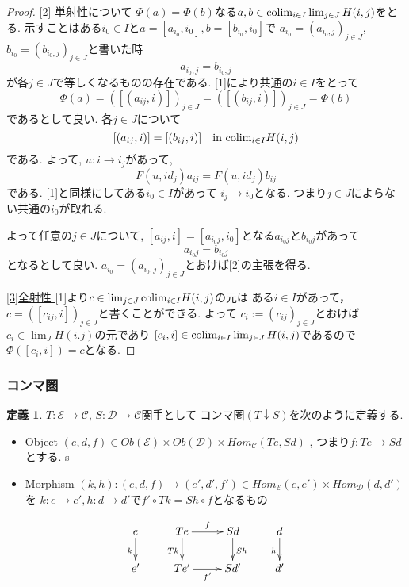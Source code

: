 \documentclass[dvipdfmx,a4paper,11pt]{article}
\newcommand{\colim}{{\rm colim}}
\theoremstyle{definition}
\newtheorem{dfn}[thm]{定義}
\begin{document}
\begin{proof}
\underline{[2] 単射性について }
$\Phi(a)=\Phi(b)$なる$a, b \in \colim_{i \in I} \lim_{j \in J}H(i,j)$をとる. 
示すことはある$i_0 \in I$と$a =[a_{i_0}, i_0], b =[b_{i_0}, i_0]$で
$a_{i_0} = (a_{i_{0},j})_{j \in J}$, $b_{i_0} = (b_{i_{0},j})_{j \in J}$と書いた時
$$
a_{i_{0},j} = b_{i_{0},j}
$$
が各$j \in J$で等しくなるものの存在である. 
[1]により共通の$i \in I$をとって
$$
\Phi(a) = ([(a_{ij}, i)])_{j \in J} = ([(b_{ij}, i)])_{j \in J} = \Phi(b)$$
であるとして良い. 
各$j \in J$について
$$
[(a_{ij}, i)] = [(b_{ij}, i)] \quad \text{in $\colim_{i \in I} H(i,j)$}
$$
である. 
よって, $u : i \to i_{j}$があって, 
$$
F(u, id_{j})a_{ij} = F(u, id_{j})b_{ij}
$$
である. [1]と同様にしてある$i_{0} \in I$があって
$i_{j} \to i_{0}$となる.
つまり$j \in J$によらない共通の$i_{0}$が取れる.

よって任意の$j \in J$について, $[a_{ij}, i] = [a_{i_{0}j}, i_{0}]$となる$a_{i_{0}j}$と$b_{i_{0}j}$があって
$$
a_{i_{0}j} = b_{i_{0}j}
$$
となるとして良い. 
$a_{i_0} = (a_{i_{0},j})_{j \in J}$とおけば[2]の主張を得る. 

\underline{[3]全射性 } 
[1]より$c \in \lim_{j \in J}\colim_{i \in I} H(i,j)$の元は
ある$i \in I$があって， $c= ([c_{ij}, i])_{j \in J}$と書くことができる. 
よって
$c_{i}:=(c_{ij})_{j \in J}$とおけば$c_i \in \lim_{J}H(i.j)$の元であり
$[c_{i} , i] \in \colim_{i \in I} \lim_{j \in J}H(i,j)$であるので
$\Phi([c_i , i])=c$となる. 
\end{proof}

\subsubsection{コンマ圏}
 \begin{tcolorbox}
 [colback = white, colframe = green!35!black, fonttitle = \bfseries,breakable = true]
\begin{dfn}
$T :  \mathcal{E} \to \mathcal{C}$, $S : \mathcal{D} \to \mathcal{C}$関手として
コンマ圏$(T \downarrow S)$を次のように定義する. 
\begin{itemize}
\item Object $(e,d,f) \in Ob(\mathcal{E}) \times Ob(\mathcal{D}) \times Hom_{\mathcal{C}}(Te, Sd)$ , つまり$f : Te \to Sd$とする. s
\item Morphism $(k,h) : (e,d,f)  \to (e',d',f') \in Hom_{\mathcal{E}}(e,e') \times Hom_{\mathcal{D}}(d,d') $ を $k : e \to e', h: d \to d'$で$f' \circ Tk = Sh \circ f$となるもの
\end{itemize}

\begin{equation*}
\xymatrix@C=25pt@R=20pt{
e \ar@{->}[d] _{k}&Te\ar@{->}[d]_{Tk}  \ar@{->}[r]^{f} & Sd\ar@{->}[d]^{Sh} &d\ar@{->}[d]_{h}\\
e'&Te'\ar@{->}[r]_{f'} &Sd'&d' \\   
}
\end{equation*}
\end{dfn}
\end{tcolorbox}
\end{document}
